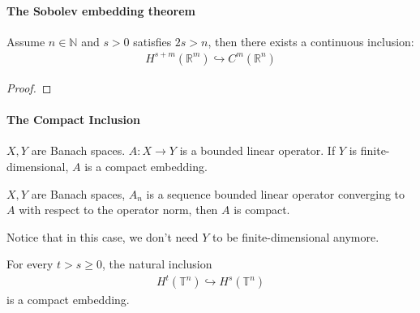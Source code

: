 \paragraph{The Sobolev embedding theorem}
\begin{example}
\end{example}

\begin{theorem}
Assume $n \in \mathbb{N}$ and $s > 0$ satisfies $2s > n$, then there exists a continuous inclusion:
\begin{align*}
	H^{s + m}(\mathbb{R}^m) \hookrightarrow C^m(\mathbb{R}^n)
\end{align*}
\end{theorem}
\begin{proof}
\end{proof}

\paragraph{The Compact Inclusion}
\begin{lemma}
	$X, Y$ are Banach spaces. $A: X\rightarrow Y$ is a bounded linear operator. If $Y$ is finite-dimensional, $A$ is a compact embedding.
\end{lemma}

\begin{lemma}
	$X, Y$ are Banach spaces, $A_n$ is a sequence bounded linear operator converging to $A$ with respect to the operator norm, then $A$ is compact.
\end{lemma}
\begin{remark}
Notice that in this case, we don't need $Y$ to be finite-dimensional anymore.	
\end{remark}

\begin{theorem}
	For every $t > s \geq 0$, the natural inclusion
	\begin{align*}
		H^t(\mathbb{T}^n) \hookrightarrow H^s(\mathbb{T}^n)
	\end{align*}
	is a compact embedding.
\end{theorem}



